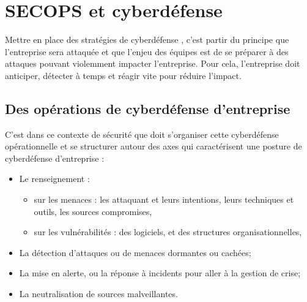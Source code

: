 %
%



\section{SECOPS et cyberdéfense}

Mettre en place des stratégies de cyberdéfense , c'est partir du principe que l'entreprise sera attaquée et que l'enjeu des équipes est de se préparer à des attaques pouvant violemment impacter l'entreprise. Pour cela, l'entreprise doit anticiper, détecter à temps et réagir vite pour réduire l'impact.

	\subsection{Des opérations de cyberdéfense d'entreprise}
	
C'est dans ce contexte de sécurité  que doit s'organiser cette cyberdéfense opérationnelle et se structurer autour des axes qui caractérisent une posture de cyberdéfense d'entreprise : 
	
\begin{itemize}
  \item Le renseignement : 
  				\begin{itemize}
  					\item sur les menaces  : les attaquant et leurs intentions, leurs techniques et outils, les sources compromises,
  					\item sur les vulnérabilités : des logiciels, et des structures organisationnelles,
			\end{itemize}
  \item La détection d'attaques ou de menaces dormantes ou cachées;
  \item La mise en alerte, ou la réponse à incidents pour aller à la gestion de crise;
  \item La neutralisation de sources malveillantes.
\end{itemize}
	
